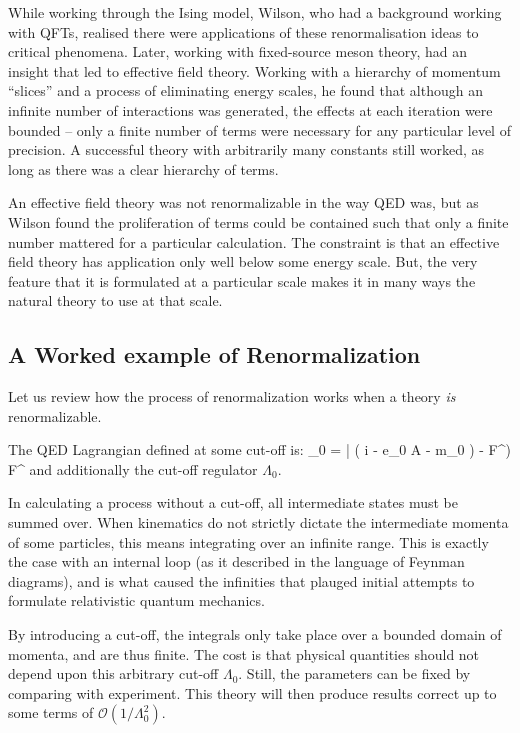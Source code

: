While working through the Ising model, Wilson, who had a background working with QFTs, realised there were applications of these renormalisation ideas to critical phenomena.    Later, working with fixed-source meson theory, had an insight that led to effective field theory.  Working with a hierarchy of momentum ``slices'' and a process of eliminating energy scales, he found that although an infinite number of interactions was generated, the effects at each iteration were bounded -- only a finite number of terms were necessary for any particular level of precision.  A successful theory with arbitrarily many constants still worked, as long as there was a clear hierarchy of terms.

An effective field theory was not renormalizable in the way QED was, but as Wilson found the proliferation of terms could be contained such that only a finite number mattered for a particular calculation.  The constraint is that an effective field theory has application only well below some energy scale.  But, the very feature that it is formulated at a particular scale makes it in many ways the natural theory to use at that scale.


\subsection{A Worked example of Renormalization}
Let us review how the process of renormalization works when a theory {\it is} renormalizable.


The QED Lagrangian defined at some cut-off is:
\beq
	_0 = 
		\bar{\Psi} \left( i \partial \cdot \gamma - e_0 A \cdot \gamma - m_0 \right) \Psi -  F^{\mu\nu}) F^{\mu\nu} 
\eeq 
and additionally the cut-off regulator $\Lambda_0$.  

In calculating a process without a cut-off, all intermediate states must be summed over.  When kinematics do not strictly dictate the intermediate momenta of some particles, this means integrating over an infinite range.  This is exactly the case with an internal loop (as it described in the language of Feynman diagrams), and is what caused the infinities that plauged initial attempts to formulate relativistic quantum mechanics. 

By introducing a cut-off, the integrals only take place over a bounded domain of momenta, and are thus finite.  The cost is that physical quantities should not depend upon this arbitrary cut-off $\Lambda_0$.  Still, the parameters can be fixed by comparing with experiment.  This theory will then produce results correct up to some terms of $\mathcal{O}(1/\Lambda_0^2)$.

